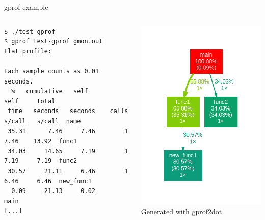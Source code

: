 \begin{frame}[fragile]{gprof example}
  \begin{columns}
    \begin{block}{}
      {\tiny
\begin{verbatim}
$ ./test-gprof
$ gprof test-gprof gmon.out
Flat profile:

Each sample counts as 0.01 seconds.
  %   cumulative   self              self     total
 time   seconds   seconds    calls   s/call   s/call  name
 35.31      7.46     7.46        1     7.46    13.92  func1
 34.03     14.65     7.19        1     7.19     7.19  func2
 30.57     21.11     6.46        1     6.46     6.46  new_func1
  0.09     21.13     0.02                             main
[...]
\end{verbatim}
      }
    \end{block}
    \begin{center}
      \includegraphics[height=0.6\textheight]{slides/sysdev-application-development/gprof2dot.pdf}\\
      {\small Generated with \href{https://github.com/jrfonseca/gprof2dot}{gprof2dot}}
    \end{center}
  \end{columns}
\end{frame}

